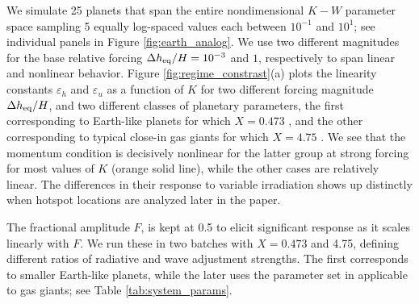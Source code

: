 \documentclass[trackchanges,twocolumn]{aastex7}
\begin{document}


We simulate 25 planets that span the entire nondimensional $K-W$ parameter space sampling 5 equally log-spaced values each between $10^{-1}$ and $10^1$;  see individual panels in Figure \ref{fig:earth_analog}. We use two different magnitudes for the base relative forcing $\Delta h_{\rm eq}/H = 10^{-3}$ and $1$, respectively to span linear and nonlinear behavior. Figure \ref{fig:regime_constrast}(a) plots the linearity constants $\varepsilon_h$ and $\varepsilon_u$ as a function of $K$ for two different forcing magnitude $\Delta h_{\rm eq}/H$, and two different classes of planetary parameters, the first corresponding to Earth-like planets for which $X=0.473$ \citep{penn2017thermal,ohno2019atmospheres,Banik2025}, and the other corresponding to typical close-in gas giants for which $X=4.75$ \citep{perez2013atmospheric}. We see that the momentum condition is decisively nonlinear for the latter group at strong forcing for most values of $K$ (orange solid line), while the other cases are relatively linear. The differences in their response to variable irradiation shows up distinctly when hotspot locations are analyzed later in the paper.

The fractional amplitude $F$, is kept at 0.5 to elicit significant response as it scales linearly with $F$. We run these in two batches with $X=0.473$ and 4.75, defining different ratios of radiative and wave adjustment strengths. The first corresponds to smaller Earth-like planets, while the later uses the parameter set in \cite{perez2013atmospheric} applicable to gas giants; see Table \ref{tab:system_params}. 
\end{document}

